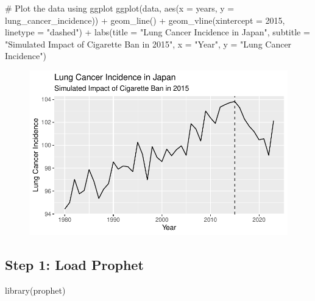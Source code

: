 \documentclass[
  letterpaper,
  DIV=11,
  numbers=noendperiod]{scrartcl}
\newenvironment{Shaded}{\begin{snugshade}}{\end{snugshade}}
\newcommand{\AttributeTok}[1]{\textcolor[rgb]{0.40,0.45,0.13}{#1}}
\newcommand{\CommentTok}[1]{\textcolor[rgb]{0.37,0.37,0.37}{#1}}
\newcommand{\DecValTok}[1]{\textcolor[rgb]{0.68,0.00,0.00}{#1}}
\newcommand{\FunctionTok}[1]{\textcolor[rgb]{0.28,0.35,0.67}{#1}}
\newcommand{\NormalTok}[1]{\textcolor[rgb]{0.00,0.23,0.31}{#1}}
\newcommand{\SpecialCharTok}[1]{\textcolor[rgb]{0.37,0.37,0.37}{#1}}
\newcommand{\StringTok}[1]{\textcolor[rgb]{0.13,0.47,0.30}{#1}}
\begin{document}
\begin{Shaded}
\begin{Highlighting}[]
\CommentTok{\# Plot the data using ggplot}
\FunctionTok{ggplot}\NormalTok{(data, }\FunctionTok{aes}\NormalTok{(}\AttributeTok{x =}\NormalTok{ years, }\AttributeTok{y =}\NormalTok{ lung\_cancer\_incidence)) }\SpecialCharTok{+}
  \FunctionTok{geom\_line}\NormalTok{() }\SpecialCharTok{+}
  \FunctionTok{geom\_vline}\NormalTok{(}\AttributeTok{xintercept =} \DecValTok{2015}\NormalTok{, }\AttributeTok{linetype =} \StringTok{"dashed"}\NormalTok{) }\SpecialCharTok{+}
  \FunctionTok{labs}\NormalTok{(}\AttributeTok{title =} \StringTok{"Lung Cancer Incidence in Japan"}\NormalTok{,}
       \AttributeTok{subtitle =} \StringTok{"Simulated Impact of Cigarette Ban in 2015"}\NormalTok{,}
       \AttributeTok{x =} \StringTok{"Year"}\NormalTok{,}
       \AttributeTok{y =} \StringTok{"Lung Cancer Incidence"}\NormalTok{)}
\end{Highlighting}
\end{Shaded}

\begin{figure}[H]

{\centering \includegraphics{ts_files/figure-pdf/unnamed-chunk-2-1.pdf}

}

\end{figure}

\hypertarget{step-1-load-prophet}{%
\subsection{Step 1: Load Prophet}\label{step-1-load-prophet}}

\begin{Shaded}
\begin{Highlighting}[]
\FunctionTok{library}\NormalTok{(prophet)}
\end{Highlighting}
\end{Shaded}
\end{document}
